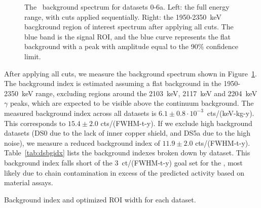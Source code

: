 \documentclass[/main.tex]{subfiles}
\begin{document}
\begin{figure}
  \centering
  \caption[\MJD\ background spectrum]{\label{mjdbgspectrum}
    The \MJD\ background spectrum for datasets 0-6a. Left: the full energy range, with cuts applied sequentially. Right: the 1950-2350~keV bacgkround region of interest spectrum after applying all cuts. The blue band is the signal ROI, and the blue curve represents the flat background with a peak with amplitude equal to the 90\% confidence limit.
  }
\end{figure}
After applying all cuts, we measure the background spectrum shown in Figure~\ref{mjdbgspectrum}.
The background index is estimated assuming a flat background in the 1950-2350~keV range, excluding regions around the 2103~keV, 2117~keV and 2204~keV $\gamma$ peaks, which are expected to be visible above the continuum background.
The measured background index across all datasets is $6.1\pm0.8\cdot10^{-3}$~cts/(keV-kg-y).
This corresponds to $15.4\pm2.0$ cts/(FWHM-t-y).
If we exclude high background datasets (DS0 due to the lack of inner copper shield, and DS5a due to the high noise), we measure a reduced background index of $11.9\pm2.0$ cts/(FWHM-t-y).
Table~\ref{tab:dsbgidx} lists the background indexes broken down by dataset.
This background index falls short of the 3~ct/(FWHM-t-y) goal set for the \MJD, most likely due to  chain contamination in excess of the predicted activity based on material assays.
\begin{table}[h]
  \centering
  \caption[Summary of datasets]{\label{tab:dsbgidx}
    Background index and optimized ROI width for each dataset.
  }
  \footnotesize
  
\end{table}
\end{document}
